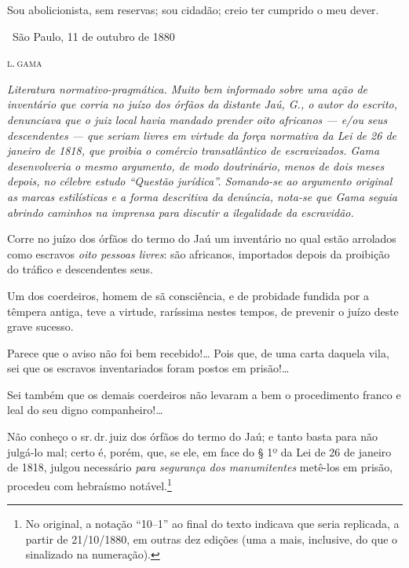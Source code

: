 {Sou abolicionista, sem reservas; sou cidadão; creio ter cumprido o meu
dever.

\medskip

\hfill\ São Paulo, 11 de outubro de 1880

\hfill\textsc{l.\,gama}


\begin{resumo}
\emph{Literatura normativo-pragmática. Muito bem informado sobre uma
ação de inventário que corria no juízo dos órfãos da distante Jaú, G., o
autor do escrito, denunciava que o juiz local havia mandado prender oito
africanos --- e/ou seus descendentes --- que seriam livres em virtude da
força normativa da Lei de 26 de janeiro de 1818, que proibia o comércio
transatlântico de escravizados. Gama desenvolveria o mesmo argumento, de
modo doutrinário, menos de dois meses depois, no célebre estudo ``Questão
jurídica''. Somando-se ao argumento original as marcas estilísticas e a
forma descritiva da denúncia, nota-se que Gama seguia abrindo caminhos
na imprensa para discutir a ilegalidade da escravidão. }
\end{resumo}

Corre no juízo dos órfãos do termo do Jaú um inventário no qual estão
arrolados como escravos \emph{oito pessoas livres}: são africanos,
importados depois da proibição do tráfico e descendentes seus.

Um dos coerdeiros, homem de sã consciência, e de probidade fundida por a
têmpera antiga, teve a virtude, raríssima nestes tempos, de prevenir o
juízo deste grave sucesso.

Parece que o aviso não foi bem recebido!\ldots{} Pois que, de uma carta
daquela vila, sei que os escravos inventariados foram postos em
prisão!\ldots{}

Sei também que os demais coerdeiros não levaram a bem o procedimento
franco e leal do seu digno companheiro!\ldots{}

Não conheço o sr.\,dr.\,juiz dos órfãos do termo do Jaú; e tanto basta
para não julgá-lo mal; certo é, porém, que, se ele, em face do § 1º da
Lei de 26 de janeiro de 1818, julgou necessário \emph{para segurança dos
manumitentes} metê-los em prisão, procedeu com hebraísmo notável.\footnote{No original, a notação ``10--1'' ao final do texto indicava que seria replicada, a partir de
  21/10/1880, em outras dez edições (uma a mais, inclusive, do que o
  sinalizado na numeração).}

}
